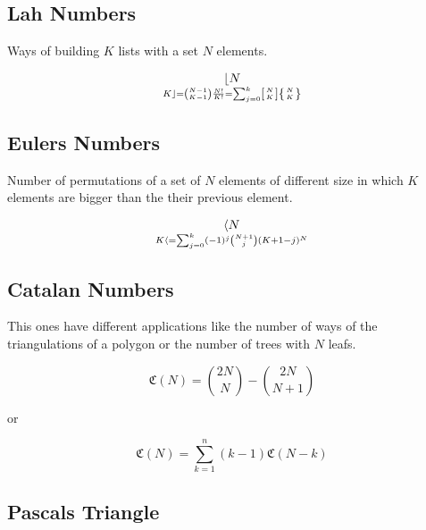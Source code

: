 \subsection{Lah Numbers}

Ways of building \(K\) lists with a set \(N\) elements.

\[\lfloor N \atop K\rfloor  = \binom{N - 1}{K - 1}\frac{N!}{K!} = \sum_{j=0}^{k}\left[N \atop K\right]\left\{N \atop K\right\}\]

\subsection{Eulers Numbers}

Number of permutations of a set of \(N\) elements of different size in which
\(K\) elements are bigger than the their previous element.

\[\langle N \atop K\langle = \sum_{j = 0}^{k}(-1)^j \binom{N + 1}{j}(K +1 -j)^N\]

\subsection{Catalan Numbers}

This ones have different applications like the number of ways of the triangulations of
a polygon or the number of trees with \(N\) leafs.

\[\mathfrak{C}(N) = \binom{2N}{N} - \binom{2N}{N + 1}\]

or

\[\mathfrak{C}(N) = \sum_{k=1}^{n}(k - 1) \mathfrak{C}(N - k)\]

\subsection{Pascals Triangle}

